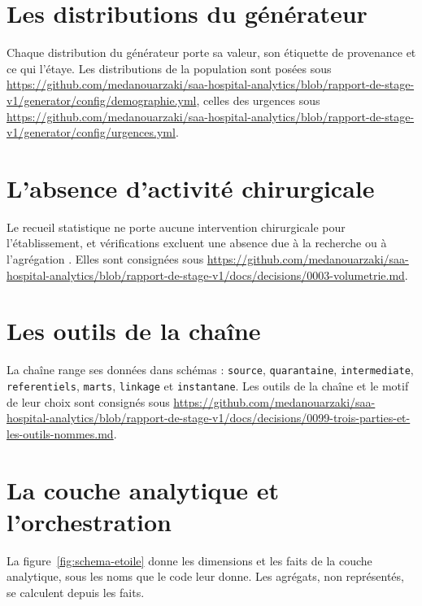 \section{Les distributions du générateur}\label{sec:complements-distributions}

Chaque distribution du générateur porte sa valeur, son étiquette de provenance et ce qui l'étaye.
Les distributions de la population sont posées sous \url{https://github.com/medanouarzaki/saa-hospital-analytics/blob/rapport-de-stage-v1/generator/config/demographie.yml}, celles
des urgences sous \url{https://github.com/medanouarzaki/saa-hospital-analytics/blob/rapport-de-stage-v1/generator/config/urgences.yml}.

\section{L'absence d'activité chirurgicale}\label{sec:complements-chirurgie}

Le recueil statistique ne porte aucune intervention chirurgicale pour l'établissement, et  vérifications excluent une absence due à la recherche ou à l'agrégation \cite{s30}. Elles sont
consignées sous \url{https://github.com/medanouarzaki/saa-hospital-analytics/blob/rapport-de-stage-v1/docs/decisions/0003-volumetrie.md}.

\section{Les outils de la chaîne}\label{sec:complements-pile}

La chaîne range ses données dans  schémas : \texttt{source}, \texttt{quarantaine}, \texttt{intermediate},
\texttt{referentiels}, \texttt{marts}, \texttt{linkage} et \texttt{instantane}. Les outils de la chaîne et le motif de leur choix sont consignés sous
\url{https://github.com/medanouarzaki/saa-hospital-analytics/blob/rapport-de-stage-v1/docs/decisions/0099-trois-parties-et-les-outils-nommes.md}.

\section{La couche analytique et l'orchestration}\label{sec:complements-analytique}

La figure~\ref{fig:schema-etoile} donne les dimensions et les faits de la couche analytique,
sous les noms que le code leur donne. Les agrégats, non représentés, se calculent depuis les
faits.

